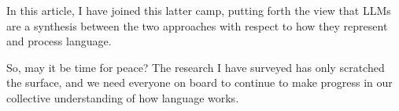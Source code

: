 In this article, I have joined this latter camp, putting forth the view that LLMs are a synthesis between the two approaches with respect to how they represent and process language.

So, may it be time for peace? The research I have surveyed has only scratched the surface, and we need everyone on board to continue to make progress in our collective understanding of how language works.

